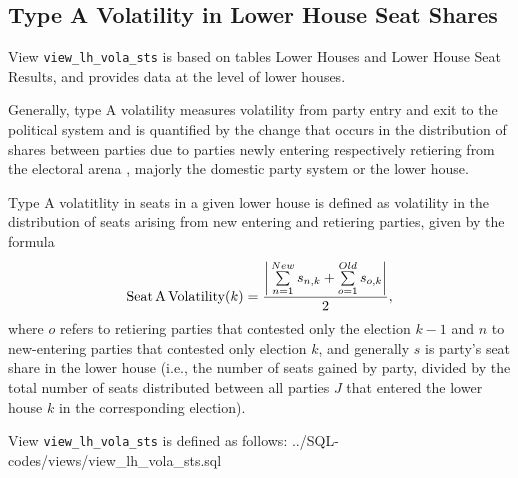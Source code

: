 \subsection{Type A Volatility in Lower House Seat Shares}\label{subsec_view_lh_vola_sts}

View \texttt{view\_lh\_vola\_sts} is based on tables Lower Houses and Lower House Seat Results, and provides data at the level of lower houses.

Generally, type A volatility measures volatility from party entry and exit to the political system and is quantified by the change that occurs in the distribution of shares between parties due to parties newly entering respectively retiering from the electoral arena \citep{Powell&Tucker2013}, majorly the domestic party system or the lower house. 

Type A volatitlity in seats in a given lower house is defined as volatility in the distribution of seats arising from new entering and retiering parties, given by the formula 
\begin{equation}\label{equ_seat_a_volatility}
\mbox{Seat\,A\,Volatility}(k) = \frac{ \bigg| \sum\limits_{n=1}^{New} s_{n,k} + \sum\limits_{o=1}^{Old} s_{o,k} \bigg| }{2},
\end{equation}
where $o$ refers to retiering parties that contested only the election $k-1$ and $n$ to new-entering parties that contested only election $k$, and generally $s$ is party's seat share in the lower house (i.e., the number of seats gained by party, divided by the total number of seats distributed between all parties $J$ that entered the lower house $k$ in the corresponding election).

View \texttt{view\_lh\_vola\_sts} is defined as follows:
%
{../SQL-codes/views/view_lh_vola_sts.sql}

